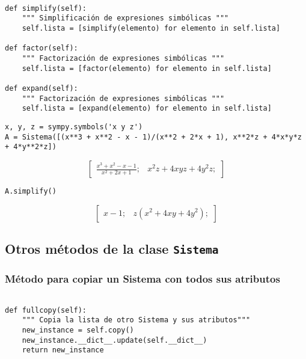 \documentclass[11pt]{report}
\begin{document}
\begin{verbatim}

def simplify(self):
    """ Simplificación de expresiones simbólicas """
    self.lista = [simplify(elemento) for elemento in self.lista]
                                                               
def factor(self):
    """ Factorización de expresiones simbólicas """
    self.lista = [factor(elemento) for elemento in self.lista]

def expand(self):
    """ Factorización de expresiones simbólicas """
    self.lista = [expand(elemento) for elemento in self.lista]

\end{verbatim}


\begin{verbatim}
x, y, z = sympy.symbols('x y z')
A = Sistema([(x**3 + x**2 - x - 1)/(x**2 + 2*x + 1), x**2*z + 4*x*y*z + 4*y**2*z])
\end{verbatim}

$$\left[ \begin{array}{cc}\frac{x^{3} + x^{2} - x - 1}{x^{2} + 2 x + 1};& x^{2} z + 4 x y z + 4 y^{2} z;\end{array} \right]$$


\begin{verbatim}
A.simplify()
\end{verbatim}

$$\left[ \begin{array}{cc}x - 1;& z \left(x^{2} + 4 x y + 4 y^{2}\right);\end{array} \right]$$

\subsection{Otros métodos de la clase \texttt{Sistema}}
\label{sec:orgc4439ae}
\subsubsection{Método para copiar un Sistema con todos sus atributos}
\label{sec:org95f5670}

\begin{verbatim}

def fullcopy(self):
    """ Copia la lista de otro Sistema y sus atributos"""
    new_instance = self.copy()
    new_instance.__dict__.update(self.__dict__)
    return new_instance

\end{verbatim}
\end{document}
